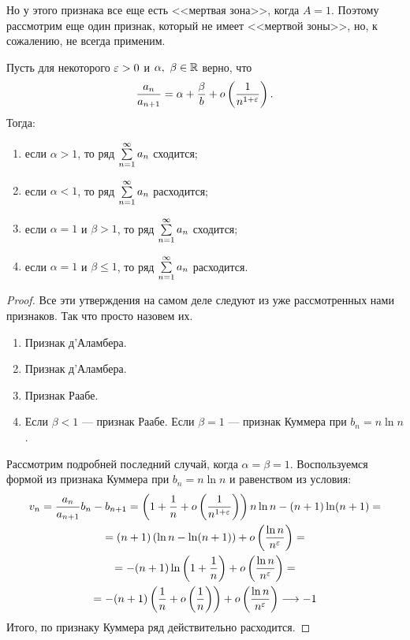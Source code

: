\documentclass[a4paper, 12pt]{article}
\begin{document}
Но у этого признака все еще есть <<мертвая зона>>, когда $A = 1$. Поэтому рассмотрим еще один признак, который не имеет <<мертвой зоны>>, но, к сожалению, не всегда применим.

\begin{Test}
Пусть для некоторого $\varepsilon > 0$ и $\alpha,\ \beta \in \mathbb{R}$ верно, что 
$$
\dfrac{a_n}{a_{n+1}} = \alpha + \frac{\beta}{b} + o\left( \frac{1}{n^{1+\varepsilon}} \right).
$$
Тогда:
\begin{enumerate}
\item если $\alpha > 1$, то ряд $\sum\limits_{n=1}^{\infty}a_n$ сходится;
\item если $\alpha < 1$, то ряд $\sum\limits_{n=1}^{\infty}a_n$ расходится;
\item если $\alpha=1$ и $\beta>1$, то ряд $\sum\limits_{n=1}^{\infty}a_n$ сходится;
\item если $\alpha=1$ и $\beta\leq1$, то ряд $\sum\limits_{n=1}^{\infty}a_n$ расходится.
\end{enumerate}
\end{Test}

\begin{proof}
Все эти утверждения на самом деле следуют из уже рассмотренных нами признаков. Так что просто назовем их.
\begin{enumerate}
\item Признак д'Аламбера.
\item Признак д'Аламбера.
\item Признак Раабе.
\item Если $\beta<1$ --- признак Раабе. Если $\beta = 1$ --- признак Куммера при $b_n = n\ln n$.
\end{enumerate}
Рассмотрим подробней последний случай, когда $\alpha=\beta=1$. Воспользуемся формой из признака Куммера при $b_n = n\ln n$ и равенством из условия:
\begin{gather*}
v_n = \frac{a_n}{a_{n+1}}b_n - b_{n+1} = \left( 1 + \frac{1}{n} + o\left( \frac{1}{n^{1+\varepsilon}}\right) \right)n\ln n - (n+1)\ln(n+1) = \\
= (n+1)\left( \ln n - \ln(n+1) \right) + o\left( \frac{\ln n}{n^\varepsilon} \right) = \\
= -(n+1)\ln\left( 1 + \frac{1}{n} \right) + o\left( \frac{\ln n}{n^\varepsilon} \right) = \\
= -(n+1)\left( \frac{1}{n} + o\left(\frac{1}{n}\right) \right) + o\left( \frac{\ln n}{n^\varepsilon} \right) \longrightarrow -1
\end{gather*}
Итого, по признаку Куммера ряд действительно расходится.
\end{proof}
\end{document}

